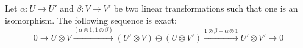 Let $\alpha: U \rightarrow U'$ and $\beta: V \rightarrow V'$ be two linear transformations such that one is an isomorphism. The following sequence is exact:
$$0 \rightarrow U \otimes V \xrightarrow{(\alpha \otimes 1, 1 \otimes \beta)} (U' \otimes V) \oplus (U \otimes V') \xrightarrow{1 \otimes \beta - \alpha \otimes 1} U' \otimes V' \rightarrow 0$$